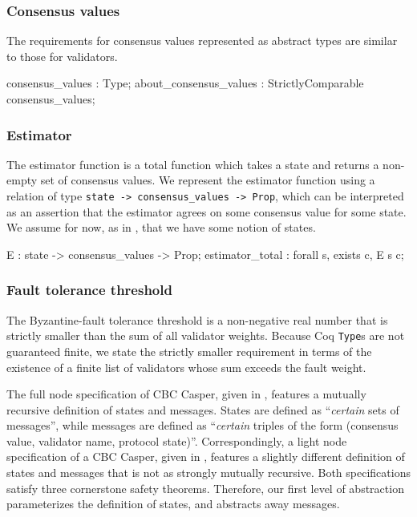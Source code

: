 \documentclass[runningheads]{llncs}
\begin{document}
\subsubsection{Consensus values}
The requirements for consensus values represented as abstract types are similar to those for validators.
\begin{coq}
	consensus_values : Type;
	about_consensus_values : StrictlyComparable consensus_values;
\end{coq}
\subsubsection{Estimator}
The estimator function is a total function which takes a state and returns a non-empty set of consensus values. We represent the estimator function using a relation of type \verb|state -> consensus_values -> Prop|, which can be interpreted as an assertion that the estimator agrees on some consensus value for some state. We assume for now, as in \cite{CBCfull}, that we have some notion of states.
\begin{coq}
	E : state -> consensus_values -> Prop;
	estimator_total : forall s, exists c, E s c;
\end{coq}
\subsubsection{Fault tolerance threshold}
The Byzantine-fault tolerance threshold is a non-negative real number that is strictly smaller than the sum of all validator weights. Because Coq \verb|Type|s are not guaranteed finite, we state the strictly smaller requirement in terms of the existence of a finite list of validators whose sum exceeds the fault weight.

The full node specification of CBC Casper, given in \cite{CBCfull}, features a mutually recursive definition of states and messages. States are defined as ``\textit{certain} sets of messages'', while messages are defined as ``\textit{certain} triples of the form (consensus value, validator name, protocol state)''. Correspondingly, a light node specification of a CBC Casper, given in \cite{CBClight}, features a slightly different definition of states and messages that is not as strongly mutually recursive. Both specifications satisfy three cornerstone safety theorems. Therefore, our first level of abstraction parameterizes the definition of states, and abstracts away messages.
\end{document}
